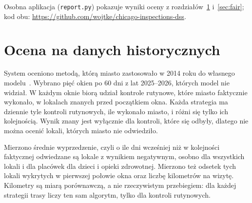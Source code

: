 \documentclass[11pt,a4paper]{article}
\begin{document}
Osobna aplikacja (\texttt{report.py}) pokazuje wyniki oceny z rozdziałów~\ref{sec:eval}
i~\ref{sec:fair}; kod obu: \url{https://github.com/wojtke/chicago-inspections-dss}.

\section{Ocena na danych historycznych}
\label{sec:eval}

System oceniono metodą, którą miasto zastosowało w 2014 roku do własnego
modelu~\cite{chicago2014}. Wybrano pięć okien po 60 dni z lat 2025--2026, których model
nie widział. W każdym oknie biorą udział kontrole rutynowe, które miasto faktycznie wykonało,
w lokalach znanych przed początkiem okna. Każda strategia ma dziennie tyle kontroli
rutynowych, ile wykonało miasto, i różni się tylko ich kolejnością. Wynik znany jest wyłącznie
dla kontroli, które się odbyły, dlatego nie można ocenić lokali, których miasto nie odwiedziło.

Mierzono średnie wyprzedzenie, czyli o ile dni wcześniej niż w kolejności faktycznej
odwiedzane są lokale z wynikiem negatywnym, osobno dla wszystkich lokali i dla placówek dla
dzieci i opieki zdrowotnej. Mierzono też odsetek tych lokali wykrytych w pierwszej połowie okna
oraz liczbę kilometrów na wizytę. Kilometry są miarą porównawczą, a nie rzeczywistym przebiegiem:
dla każdej strategii trasy liczy ten sam algorytm, tylko dla kontroli rutynowych.

\begin{table}[ht]
\centering\small
\caption{Strategie przy pełnym zespole, średnia z pięciu okien.}
\label{tab:policies}
\end{table}
\end{document}
